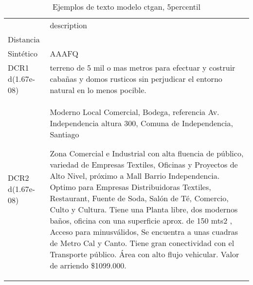 \begin{table}[H]
\centering
\fontsize{10}{14}\selectfont
\caption{Ejemplos de texto modelo ctgan, 5percentil}
\label{table-example-economicos-b-2-ctgan-5p-text}
\begin{tabular}{|l|m{35em}|}
\hline
\rowcolor[gray]{0.8}
 & description \\
Distancia &  \\
\hline Sintético & AAAFQ \\
\hline DCR1 d(1.67e-08) & terreno de 5 mil o mas metros para efectuar y costruir caba\~nas y domos rusticos sin perjudicar el entorno natural en lo menos pocible. \\
\hline DCR2 d(1.67e-08) & Moderno  Local Comercial, Bodega, referencia Av. Independencia altura 300, Comuna de Independencia, Santiago

Zona Comercial e Industrial con alta fluencia de p\'ublico, variedad de Empresas Textiles, Oficinas y Proyectos de Alto Nivel, pr\'oximo a Mall Barrio Independencia. Optimo para Empresas Distribuidoras Textiles, Restaurant, Fuente de Soda, Sal\'on de T\'e, Comercio, Culto y Cultura. Tiene una Planta libre, dos modernos ba\~nos, oficina con una superficie aprox. de 150 mts2 , Acceso para minusv\'alidos,  Se encuentra a unas cuadras de Metro Cal y Canto. Tiene gran conectividad con el Transporte p\'ublico. \'Area con alto flujo vehicular. Valor de arriendo \$1099.000. \\
\hline
\end{tabular}
\end{table}
